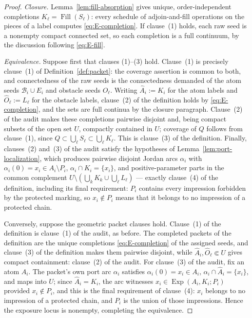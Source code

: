 \documentclass[11pt,reqno]{amsart}
\theoremstyle{definition}
\theoremstyle{remark}
\newcommand{\Fill}{\operatorname{Fill}}
\newcommand{\Exp}{\operatorname{Exp}}
\begin{document}
\begin{proof}
\emph{Closure.}
Lemma~\ref{lem:fill-absorption} gives unique, order-independent completions
$K_\ell=\Fill(S_\ell)$: every schedule of adjoin-and-fill operations on the pieces of
a label computes \eqref{eq:E-completion}. If clause~(1) holds, each raw seed is a
nonempty compact connected set, so each completion is a full continuum, by the discussion
following \eqref{eq:E-fill}.

\emph{Equivalence.}
Suppose first that clauses (1)--(3) hold. Clause~(1) is precisely clause~(1) of
Definition~\ref{def:packet}: the coverage assertion is common to both, and
connectedness of the raw seeds is the connectedness demanded of the atom seeds
$\mathcal B_i\cup E_i$ and obstacle seeds $O_\ell$. Writing $\widehat A_i:=K_i$ for the atom
labels and $\widehat O_\ell:=L_\ell$ for the obstacle labels, clause~(2) of the
definition holds by \eqref{eq:E-completion}, and the sets are full continua by the
closure paragraph. Clause~(2) of the audit makes these completions pairwise disjoint
and, being compact subsets of the open set $U$, compactly contained in $U$; coverage
of $Q$ follows from clause~(1), since $Q\subset\bigcup_\ell S_\ell\subset
\bigcup_\ell K_\ell$. This is clause~(3) of the definition. Finally, clauses~(2)
and~(3) of the audit satisfy the hypotheses of
Lemma~\ref{lem:port-localization}, which produces pairwise disjoint Jordan arcs
$\alpha_i$ with $\alpha_i(0)=x_i\in A_i\setminus P_i$,
$\alpha_i\cap K_i=\{x_i\}$, and positive-parameter parts in the common complement
$U\setminus(\bigcup_kK_k\cup\bigcup_\ell L_\ell)$ --- exactly clause~(4) of the
definition, including its final requirement: $P_i$ contains every impression
forbidden by the protected marking, so $x_i\notin P_i$ means that it belongs to no
impression of a protected chain.

Conversely, suppose the geometric packet clauses hold. Clause~(1) of the definition
is clause~(1) of the audit, as before. The completed packets of the definition are
the unique completions \eqref{eq:E-completion} of the assigned seeds, and clause~(3)
of the definition makes them pairwise disjoint, while
$\widehat A_i,\widehat O_\ell\Subset U$ gives compact containment: clause~(2) of the
audit. For clause~(3) of the audit, fix an atom $A_i$. The packet's own port arc
$\alpha_i$ satisfies $\alpha_i(0)=x_i\in A_i$, $\alpha_i\cap\widehat A_i=\{x_i\}$,
and maps into $U$; since $\widehat A_i=K_i$, the arc witnesses
$x_i\in\Exp(A_i,K_i;P_i)$ provided $x_i\notin P_i$, and this is the final requirement
of clause~(4): $x_i$ belongs to no impression of a protected chain, and $P_i$ is the
union of those impressions. Hence the exposure locus is nonempty, completing the
equivalence.


\end{proof}
\end{document}
